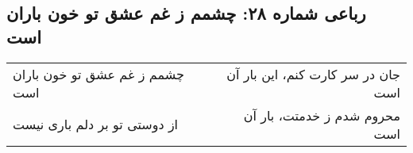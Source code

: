 \begin{center}
\section*{رباعی شماره ۲۸: چشمم ز غم عشق تو خون باران است}
\label{sec:028}
\begin{longtable}{l p{0.5cm} r}
چشمم ز غم عشق تو خون باران است
&&
جان در سر کارت کنم، این بار آن است
\\
از دوستی تو بر دلم باری نیست
&&
محروم شدم ز خدمتت، بار آن است
\\
\end{longtable}
\end{center}
